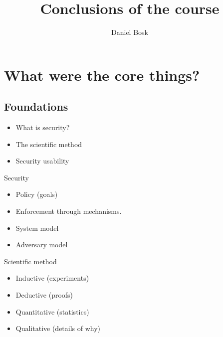 \title{%
  Conclusions of the course
}
\author{Daniel Bosk}


\mode*

\begin{abstract}
  
\end{abstract}


\section{What were the core things?}

\subsection{Foundations}

\begin{frame}
  \begin{itemize}
    \item What is security?
    \item The scientific method
    \item Security usability
  \end{itemize}
\end{frame}

\begin{frame}
  \begin{block}{Security}
    \begin{itemize}
      \item Policy (goals)
      \item Enforcement through mechanisms.

        \pause

      \item System model
      \item Adversary model
    \end{itemize}
  \end{block}
\end{frame}

\begin{frame}
  \begin{block}{Scientific method}
    \begin{itemize}
      \item Inductive (experiments)
      \item Deductive (proofs)
      \item Quantitative (statistics)
      \item Qualitative (details of why)
    \end{itemize}
  \end{block}
\end{frame}

